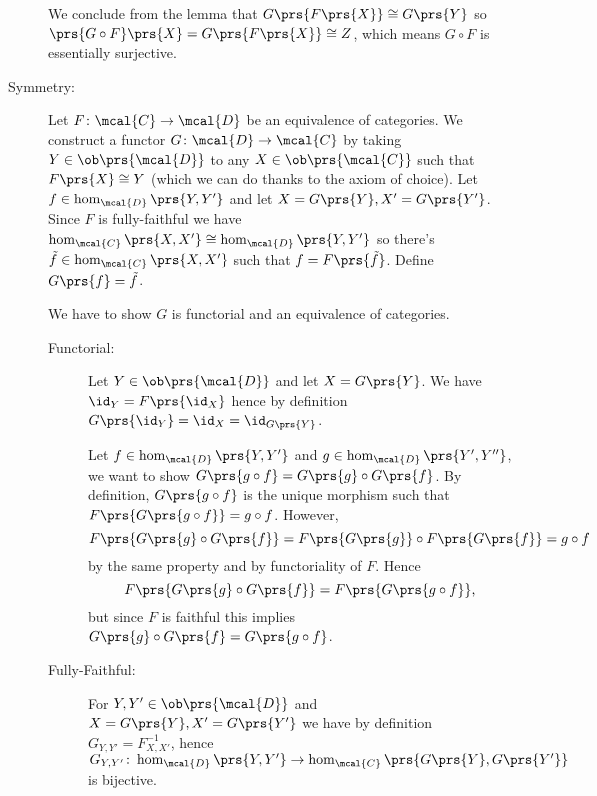 \documentclass[10pt]{article}
\begin{document}
\begin{solution}
\begin{description}
We conclude from the lemma that $G\prs{F\prs{X}} \cong G\prs{Y}$ so $\prs{G \circ F}\prs{X} = G\prs{F\prs{X}} \cong Z$, which means $G \circ F$ is essentially surjective.

\item[Symmetry:]
Let $F \colon \mcal{C} \to \mcal{D}$ be an equivalence of categories.
We construct a functor $G \colon \mcal{D} \to \mcal{C}$ by taking $Y \in \ob\prs{\mcal{D}}$ to any $X \in \ob\prs{\mcal{C}}$ such that $F\prs{X} \cong Y$ (which we can do thanks to the axiom of choice). Let $f \in \hom_{\mcal{D}}\prs{Y,Y'}$ and let $X = G\prs{Y}, X' = G\prs{Y'}$. Since $F$ is fully-faithful we have $\hom_{\mcal{C}}\prs{X,X'} \cong \hom_{\mcal{D}}\prs{Y, Y'}$ so there's $\tilde{f} \in \hom_{\mcal{C}}\prs{X,X'}$ such that $f = F\prs{\tilde{f}}$. Define $G\prs{f} = \tilde{f}$.

We have to show $G$ is functorial and an equivalence of categories.

\begin{description}
\item[Functorial:]
Let $Y \in \ob\prs{\mcal{D}}$ and let $X = G\prs{Y}$. We have $\id_Y = F\prs{\id_X}$ hence by definition $G\prs{\id_Y} = \id_X = \id_{G\prs{Y}}$.

Let $f \in \hom_{\mcal{D}}\prs{Y, Y'}$ and $g \in \hom_{\mcal{D}}\prs{Y', Y''}$, we want to show $G\prs{g \circ f} = G\prs{g} \circ G\prs{f}$. By definition, $G\prs{g \circ f}$ is the unique morphism such that $F\prs{G\prs{g \circ f}} = g \circ f$. However,
\[F\prs{G\prs{g} \circ G\prs{f}} = F\prs{G\prs{g}} \circ F\prs{G\prs{f}} = g \circ f\]
by the same property and by functoriality of $F$. Hence
\[F\prs{G\prs{g} \circ G\prs{f}} = F\prs{G\prs{g \circ f}} \text{,}\]
but since $F$ is faithful this implies $G\prs{g} \circ G\prs{f} = G\prs{g \circ f}$.

\item[Fully-Faithful:]
For $Y,Y' \in \ob\prs{\mcal{D}}$ and $X = G\prs{Y}, X' = G\prs{Y'}$ we have by definition $G_{Y,Y'} = F_{X,X'}^{-1}$, hence $G_{Y,Y'} \colon \hom_{\mcal{D}}\prs{Y,Y'} \to \hom_{\mcal{C}}\prs{G\prs{Y}, G\prs{Y'}}$ is bijective.


\end{description}
\end{description}
\end{solution}
\end{document}
